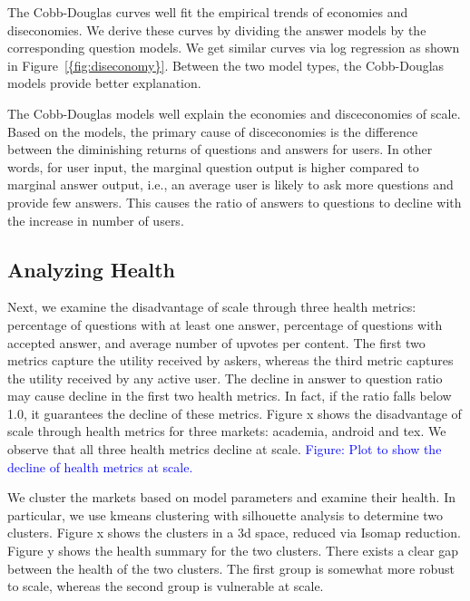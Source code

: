The Cobb-Douglas curves well fit the empirical trends of economies and diseconomies. We derive these curves by dividing the answer models by the corresponding question models. We get similar curves via log regression as shown in Figure~\ref{{fig:diseconomy}}. Between the two model types, the Cobb-Douglas models provide better explanation.

The Cobb-Douglas models well explain the economies and disceconomies of scale. Based on the models, the primary cause of disceconomies is the difference between the diminishing returns of questions and answers for users. In other words, for user input, the marginal question output is higher compared to marginal answer output, i.e., an average user is likely to ask more questions and provide few answers. This causes the ratio of answers to questions to decline with the increase in number of users.

\subsection{Analyzing Health}
Next, we examine the disadvantage of scale through three health metrics: percentage of questions with at least one answer, percentage of questions with accepted answer, and average number of upvotes per content. The first two metrics capture the utility received by askers, whereas the third metric captures the utility received by any active user. The decline in answer to question ratio may cause decline in the first two health metrics. In fact, if the ratio falls below 1.0, it guarantees the decline of these metrics. Figure x shows the disadvantage of scale through health metrics for three markets: academia, android and tex. We observe that all three health metrics decline at scale. \textcolor{blue}{Figure: Plot to show the decline of health metrics at scale.}

We cluster the markets based on model parameters and examine their health. In particular, we use kmeans clustering with silhouette analysis to determine two clusters. Figure x shows the clusters in a 3d space, reduced via Isomap reduction. Figure y shows the health summary for the two clusters. There exists a clear gap between the health of the two clusters. The first group is somewhat more robust to scale, whereas the second group is vulnerable at scale.

